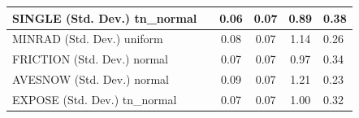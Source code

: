 \begin{table}
\begin{center}
\begin{tabular}{|l|l|c|c|c|l|}
			\hline
			SINGLE (Std. Dev.) tn_normal &  & 0.06 & 0.07 & 0.89 & 0.38 \\
			\hline
			MINRAD (Std. Dev.) uniform &  & 0.08 & 0.07 & 1.14 & 0.26 \\
			\hline
			FRICTION (Std. Dev.) normal &  & 0.07 & 0.07 & 0.97 & 0.34 \\
			\hline
			AVESNOW (Std. Dev.) normal &  & 0.09 & 0.07 & 1.21 & 0.23 \\
			\hline
			EXPOSE (Std. Dev.) tn_normal &  & 0.07 & 0.07 & 1.00 & 0.32 \\
			\hline
		\end{tabular}
	\end{center}
\end{table}